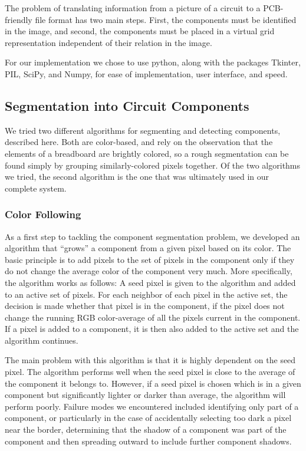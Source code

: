 \documentclass[10pt,twocolumn,letterpaper]{article}
\begin{document}
The problem of translating information from a picture of a circuit to a
PCB-friendly file format has two main steps. First, the components must be
identified in the image, and second, the components must be placed in a virtual
grid representation independent of their relation in the image. 

For our implementation we chose to use python, along with the packages
Tkinter, PIL, SciPy, and Numpy, for ease of implementation, user
interface, and speed.

\subsection{Segmentation into Circuit Components}

We tried two different algorithms for segmenting and detecting
components, described here. Both are color-based, and rely on the
observation that the elements of a breadboard are brightly colored, so
a rough segmentation can be found simply by grouping similarly-colored
pixels together. Of the two algorithms we tried, the second algorithm
is the one that was ultimately used in our complete system.

\subsubsection{Color Following}

As a first step to tackling the component segmentation problem, we
developed an algorithm that ``grows'' a component from a given pixel
based on its color. The basic principle is to add pixels to the set of
pixels in the component only if they do not change the average color
of the component very much. More specifically, the algorithm works as
follows: A seed pixel is given to the algorithm and added to an active
set of pixels. For each neighbor of each pixel in the active set, the
decision is made whether that pixel is in the component, if the pixel
does not change the running RGB color-average of all the pixels
current in the component. If a pixel is added to a component, it is
then also added to the active set and the algorithm continues.

The main problem with this algorithm is that it is highly dependent on the seed
pixel. The algorithm performs well when the seed pixel is close to the
average of the component it belongs to. However, if a seed pixel is
chosen which is in a given component but significantly lighter or
darker than average, the algorithm will perform poorly. Failure modes
we encountered included identifying only part of a component, or
particularly in the case of accidentally selecting too dark a pixel
near the border, determining that the shadow of a component was part
of the component and then spreading outward to include further
component shadows. 
\end{document}
